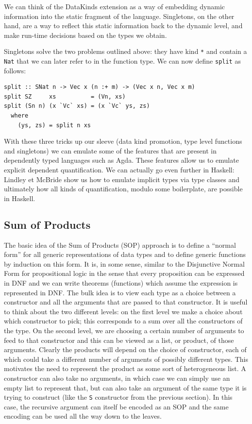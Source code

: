 \documentclass[11pt, titlepage]{article}
\begin{document}
We can think of the DataKinds extension as a way of embedding dynamic information into the static fragment of the language. Singletons, on the other hand, are a way to reflect this static information back to the dynamic level, and make run-time decisions based on the types we obtain.

Singletons solve the two problems outlined above: they have kind \texttt{*} and contain a \texttt{Nat} that we can later refer to in the function type. We can now define \texttt{split} as follows:

\begin{verbatim}
split :: SNat n -> Vec x (n :+ m) -> (Vec x n, Vec x m)
split SZ     xs          = (Vn, xs)
split (Sn n) (x `Vc` xs) = (x `Vc` ys, zs)
  where
    (ys, zs) = split n xs
\end{verbatim}

With these three tricks up our sleeve (data kind promotion, type level functions and singletons) we can emulate some of the features that are present in dependently typed languages such as Agda. These features allow us to emulate explicit dependent quantification. We can actually go even further in Haskell: Lindley et McBride \cite{hasochism} show us how to emulate implicit types via type classes and ultimately how all kinds of quantification, modulo some boilerplate, are possible in Haskell.

\subsection{Sum of Products}\label{SOP}

The basic idea of the Sum of Products (SOP) approach is to define a ``normal form'' for all generic representations of data types and 
to define generic functions by induction on this form. It is, in some sense, similar to the Disjunctive Normal Form for propositional logic in the sense that every proposition can be expressed in DNF and we can write theorems (functions) which assume the expression is represented in DNF.
The bulk idea is to view each type as a choice between a constructor and all the arguments that are passed to that constructor. It is useful to think about the two different levels: on the first level we make a choice about which constructor to pick; this corresponds to a sum
over all the constructors of the type. On the second level, we are choosing a certain number of arguments to feed to that constructor and this can be viewed as a list, or product, of 
those arguments. Clearly the products will depend on the choice of constructor, 
each of which could take a different number of arguments of possibly 
different types. This motivates the need to represent the product as some sort 
of heterogeneous list. A constructor can also take no arguments, in which case we 
can simply use an empty list to represent that, but can also take an argument of the same type it is trying to construct (like the \texttt{S} constructor from the previous section). 
In this case, the recursive argument can itself be encoded as an SOP and the same encoding can be used all the way down to the leaves. 
\end{document}
